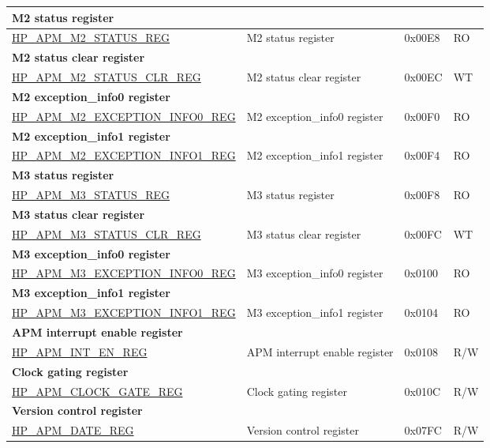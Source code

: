 \begin{longtable}{ | p{6cm} | p{6.2cm} | p{2.2cm} | p{1cm} | }
\multicolumn{4}{|l|}{\textbf{M2 status register}} \\ \hline
\hyperref[regdesc:HPAPMM2STATUSREG]{HP\_APM\_M2\_STATUS\_REG} & M2 status register & 0x00E8 & RO \\ \hline
\multicolumn{4}{|l|}{\textbf{M2 status clear register}} \\ \hline
\hyperref[regdesc:HPAPMM2STATUSCLRREG]{HP\_APM\_M2\_STATUS\_CLR\_REG} & M2 status clear register & 0x00EC & WT \\ \hline
\multicolumn{4}{|l|}{\textbf{M2 exception\_info0 register}} \\ \hline
\hyperref[regdesc:HPAPMM2EXCEPTIONINFO0REG]{HP\_APM\_M2\_EXCEPTION\_INFO0\_REG} & M2 exception\_info0 register & 0x00F0 & RO \\ \hline
\multicolumn{4}{|l|}{\textbf{M2 exception\_info1 register}} \\ \hline
\hyperref[regdesc:HPAPMM2EXCEPTIONINFO1REG]{HP\_APM\_M2\_EXCEPTION\_INFO1\_REG} & M2 exception\_info1 register & 0x00F4 & RO \\ \hline
\multicolumn{4}{|l|}{\textbf{M3 status register}} \\ \hline
\hyperref[regdesc:HPAPMM3STATUSREG]{HP\_APM\_M3\_STATUS\_REG} & M3 status register & 0x00F8 & RO \\ \hline
\multicolumn{4}{|l|}{\textbf{M3 status clear register}} \\ \hline
\hyperref[regdesc:HPAPMM3STATUSCLRREG]{HP\_APM\_M3\_STATUS\_CLR\_REG} & M3 status clear register & 0x00FC & WT \\ \hline
\multicolumn{4}{|l|}{\textbf{M3 exception\_info0 register}} \\ \hline
\hyperref[regdesc:HPAPMM3EXCEPTIONINFO0REG]{HP\_APM\_M3\_EXCEPTION\_INFO0\_REG} & M3 exception\_info0 register & 0x0100 & RO \\ \hline
\multicolumn{4}{|l|}{\textbf{M3 exception\_info1 register}} \\ \hline
\hyperref[regdesc:HPAPMM3EXCEPTIONINFO1REG]{HP\_APM\_M3\_EXCEPTION\_INFO1\_REG} & M3 exception\_info1 register & 0x0104 & RO \\ \hline
\multicolumn{4}{|l|}{\textbf{APM interrupt enable register}} \\ \hline
\hyperref[regdesc:HPAPMINTENREG]{HP\_APM\_INT\_EN\_REG} & APM interrupt enable register & 0x0108 & R/W \\ \hline
\multicolumn{4}{|l|}{\textbf{Clock gating register}} \\ \hline
\hyperref[regdesc:HPAPMCLOCKGATEREG]{HP\_APM\_CLOCK\_GATE\_REG} & Clock gating register & 0x010C & R/W \\ \hline
\multicolumn{4}{|l|}{\textbf{Version control register}} \\ \hline
\hyperref[regdesc:HPAPMDATEREG]{HP\_APM\_DATE\_REG} & Version control register & 0x07FC & R/W \\ \hline
\end{longtable}

